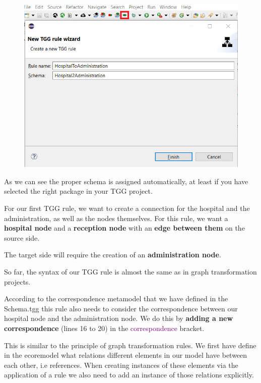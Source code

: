 \begin{figure}[h]
    \centering
    \includegraphics[scale=0.5 ]{pictures/tgg_rule_creation.png}
    \caption{}
    \label{TGG rule creation}
\end{figure}

As we can see the proper schema is assigned automatically, at least if you have selected the right package in your TGG project.\newline

For our first TGG rule, we want to create a connection for the hospital and the administration, as well as the nodes themselves. For this rule, we want a \textbf{hospital node} and a \textbf{reception node} with an \textbf{edge between them} on the source side.

The target side will require the creation of an \textbf{administration node}.

So far, the syntax of our TGG rule is almost the same as in graph transformation projects.\newline

According to the correspondence metamodel that we have defined in the Schema.tgg this rule also needs to consider the correspondence between our hospital node and the administration node. We do this by \textbf{adding a new correspondence} (lines 16 to 20) in the \textcolor{Purple}{correspondence} bracket.

This is similar to the principle of graph transformation rules. We first have define in the ecoremodel what relations different elements in our model have between each other, i.e references.
When creating instances of these elements via the application of a rule we also need to add an instance of those relations explicitly.

